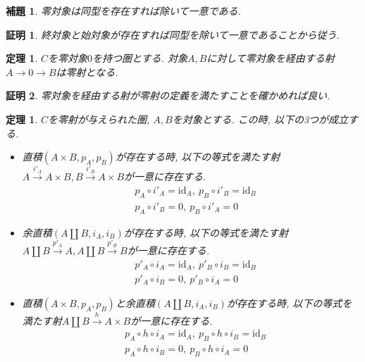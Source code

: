\documentclass[a4paper,12pt]{ltjsarticle}
\theoremstyle{break}
\newtheorem{lem}[thm]{補題}
\newtheorem{thrm}[thm]{定理}
\newtheorem*{prf}{証明}
\newcommand{\xr}[1]{\xrightarrow{#1}}
\newcommand{\id}{\mathrm{id}}
\newcommand{\ci}{\circ}
\newcommand{\ti}{\times}
\newcommand{\am}{\amalg}
\numberwithin{equation}{section}
\begin{document}
\begin{lem}
  零対象は同型を存在すれば除いて一意である. 
\end{lem}

\begin{prf}
  終対象と始対象が存在すれば同型を除いて一意であることから従う. 
\end{prf}


\begin{thrm}
  $C$を零対象$0$を持つ圏とする. 
  対象$A,B$に対して零対象を経由する射$A \to 0 \to B$は零射となる. 
\end{thrm} 

\begin{prf}
  零対象を経由する射が零射の定義を満たすことを確かめれば良い. 
\end{prf}


\begin{thrm}
  $C$を零射が与えられた圏, $A,B$を対象とする. 
  この時, 以下の3つが成立する. 
  \begin{itemize}
    \item 直積$(A \ti B,p_A,p_B)$が存在する時, 以下の等式を満たす射$A \xr{i'_A} A \ti B, B \xr{i'_B} A \ti B$が一意に存在する. 
    \begin{align*}
      &p_A \ci i'_A = \id_A, ~ p_B \ci i'_B = \id_B \\
      &p_A \ci i'_B = 0, ~ p_B \ci i'_A = 0
    \end{align*}
    \item 余直積$(A \am B,i_A,i_B)$が存在する時, 以下の等式を満たす射$A \am B \xr{p'_A} A,A \am B \xr{p'_B} B$が一意に存在する. 
    \begin{align*}
      &p'_A \ci i_A = \id_A, ~ p'_B \ci i_B = \id_B \\
      &p'_A \ci i_B = 0, ~ p'_B \ci i_A = 0
    \end{align*}
    \item 直積$(A \ti B,p_A,p_B)$と余直積$(A \am B,i_A,i_B)$が存在する時, 以下の等式を満たす射$A \am B \xr{h} A \ti B$が一意に存在する. 
    \begin{align*}
      &p_A \ci h \ci i_A = \id_A, ~ p_B \ci h \ci i_B = \id_B \\
      &p_A \ci h \ci i_B = 0, ~ p_B \ci h \ci i_A = 0
    \end{align*}
  \end{itemize}
\end{thrm}
\end{document}
